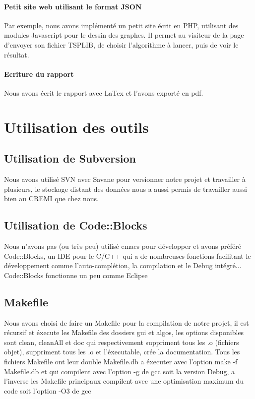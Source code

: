 \documentclass[12pt]{report}
\begin{document}
{{{{{{{\paragraph{Petit site web utilisant le format JSON}

Par exemple, nous avons implémenté un petit site écrit en PHP, utilisant des modules Javascript pour le dessin des graphes. Il permet au visiteur de la page d'envoyer son fichier TSPLIB, de choisir l'algorithme à lancer, puis de voir le résultat.

\paragraph{Ecriture du rapport}

Nous avons écrit le rapport avec LaTex et l'avons exporté en pdf.



\section{Utilisation des outils}

\subsection{Utilisation de Subversion}

Nous avons utilisé SVN avec Savane pour versionner notre projet et travailler à plusieurs, le stockage distant des données nous a aussi permis de travailler aussi bien au CREMI que chez nous.

\subsection{Utilisation de Code::Blocks}

Nous n'avons pas (ou très peu) utilisé emacs pour développer et avons préféré Code::Blocks, un IDE pour le C/C++ qui a de nombreuses fonctions facilitant le développement comme l'auto-complétion, la compilation et le Debug intégré... Code::Blocks fonctionne un peu comme Eclipse


\subsection{Makefile}

Nous avons choisi de faire un Makefile pour la compilation de notre projet, il est récursif et éxecute les Makefile des dossiers gui et algos, les options disponibles sont clean, cleanAll et doc qui respectivement suppriment tous les .o (fichiers objet), suppriment tous les .o et l'éxecutable, crée la documentation. Tous les fichiers Makefile ont leur double Makefile.db a éxecuter avec l'option make -f Makefile.db et qui compilent avec l'option -g de gcc soit la version Debug, a l'inverse les Makefile principaux compilent avec une optimisation maximum du code soit l'option -O3 de gcc


}}}}}}}
\end{document}
